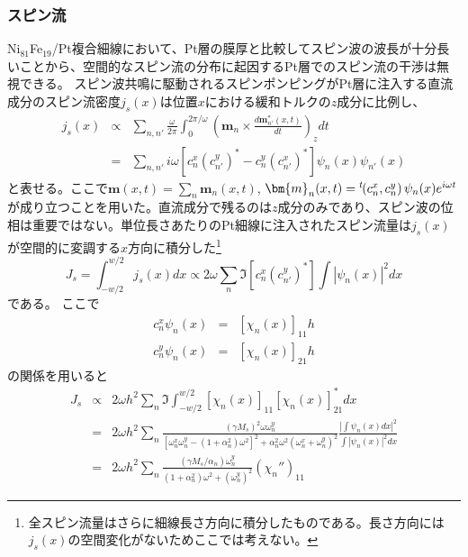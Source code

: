 \subsubsection{スピン流}
Ni$_{81}$Fe$_{19}$/Pt複合細線において、Pt層の膜厚と比較してスピン波の波長が十分長いことから、空間的なスピン流の分布に起因するPt層でのスピン流の干渉は無視できる。
スピン波共鳴に駆動されるスピンポンピングがPt層に注入する直流成分のスピン流密度$j_s(x)$は位置$x$における緩和トルクの$z$成分に比例し、
\begin{eqnarray}
 {j_s}(x) &\propto &\sum\limits_{n,n'} {\frac{\omega }{{2\pi }}} \mathop \int \nolimits_0^{2\pi /\omega } {\left( {{\bm{m}_n} \times \frac{{d{\bm{m}^*_{n'}}(x,t)}}{{dt}}} \right)_z}dt \nonumber\\ 
 & =& \sum\limits_{n,n'} {i\omega \left[ {c_n^x{{(c_{n'}^y)}^*} - c_n^y{{(c_{n'}^x)}^*}} \right]} {\psi _n}(x){\psi _{n'}}(x) \label{density}
\end{eqnarray}
と表せる。ここで$\bm{m}(x,t)=\sum_n \bm{m}_n(x,t)$, $\bm{m}_n(x,t)={}^t\hspace{-1mm}\left( {c_n^ x ,c_n^ y } \right)\psi_n(x)e^{i\omega t}$が成り立つことを用いた。直流成分で残るのは$z$成分のみであり、スピン波の位相は重要ではない。単位長さあたりのPt細線に注入されたスピン流量は$j_s(x)$が空間的に変調する$x$方向に積分した\footnote{全スピン流量はさらに細線長さ方向に積分したものである。長さ方向には$j_s(x)$の空間変化がないためここでは考えない。}
\begin{equation}
{J_s} = \mathop\int \nolimits_{ - w/2}^{w/2} {j_s}(x)dx \propto  2\omega \sum\limits_n \Im  \left[ {c_n^x{{(c_{n'}^y)}^*}} \right]\int {{{\left| {{\psi _n}(x)} \right|}^2}dx} 
\end{equation}
である。
ここで
\begin{eqnarray}
 c_n^x{\psi _n}(x) &=& {\left[ {{\chi _n}(x)} \right]_{11}}h \\ 
 c_n^y{\psi _n}(x) &=& {\left[ {{\chi _n}(x)} \right]_{21}}h 
\end{eqnarray}
の関係を用いると
\begin{eqnarray}
 {J_s} &\propto & 2\omega {h^2}\sum\limits_n \Im  \mathop \int \nolimits_{ - w/2}^{w/2} {\left[ {{\chi _n}(x)} \right]_{11}}\left[ {\chi _n}(x) \right]^*_{21} dx \nonumber \\ 
 & = &  2\omega {h^2}\sum\limits_n {\frac{{{{(\gamma {M_s})}^2}\omega \omega _n^y}}{{{{\left[ {\omega _n^x\omega _n^y - (1 + \alpha _n^2){\omega ^2}} \right]}^2} + \alpha _n^2{\omega ^2}{{(\omega _n^x + \omega _n^y)}^2}}}} \frac{{{{\left| {\int {{\psi _n}(x)dx} } \right|}^2}}}{{\int {{{\left| {{\psi _n}(x)} \right|}^2}dx} }} \nonumber \\ 
 & = &  2\omega {h^2}\sum\limits_n {\frac{{(\gamma {M_s}/{\alpha _n})\omega _n^y}}{{(1 + \alpha _n^2){\omega ^2} + {{(\omega _n^y)}^2}}}} {(\chi _n'')_{11}} 
\end{eqnarray}
